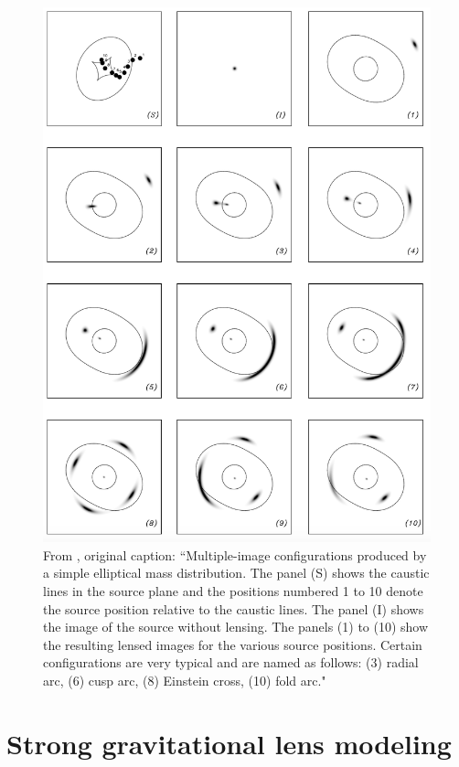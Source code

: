 \begin{figure}
\centering
\includegraphics[height=0.8\textheight]{Intro/image_config.png}
\caption[Strong lensing caustics, critical curves, and multiple image configurations]{From \citet{Kneib:2011qy}, original caption: ``Multiple-image configurations produced by a simple elliptical mass distribution. The panel (S) shows the caustic lines in the source plane and the positions numbered 1 to 10 denote the source position relative to the caustic lines. The panel (I) shows the image of the source without lensing. The panels (1) to (10) show the resulting lensed images for the various source positions. Certain configurations are very typical and are named as follows: (3) radial arc, (6) cusp arc, (8) Einstein cross, (10) fold arc."}
\label{intro:fig:image_config}
\end{figure}

\section{Strong gravitational lens modeling}

